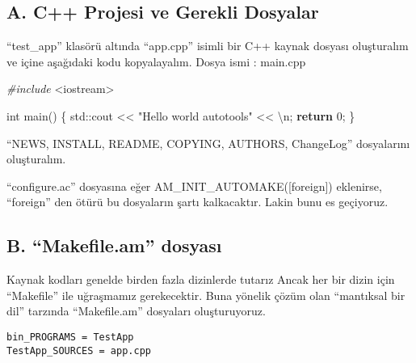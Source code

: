 \documentclass[
]{book}
\newenvironment{Shaded}{\begin{snugshade}}{\end{snugshade}}
\newcommand{\BuiltInTok}[1]{#1}
\newcommand{\CharTok}[1]{\textcolor[rgb]{0.31,0.60,0.02}{#1}}
\newcommand{\ControlFlowTok}[1]{\textcolor[rgb]{0.13,0.29,0.53}{\textbf{#1}}}
\newcommand{\DataTypeTok}[1]{\textcolor[rgb]{0.13,0.29,0.53}{#1}}
\newcommand{\DecValTok}[1]{\textcolor[rgb]{0.00,0.00,0.81}{#1}}
\newcommand{\FunctionTok}[1]{\textcolor[rgb]{0.00,0.00,0.00}{#1}}
\newcommand{\ImportTok}[1]{#1}
\newcommand{\NormalTok}[1]{#1}
\newcommand{\PreprocessorTok}[1]{\textcolor[rgb]{0.56,0.35,0.01}{\textit{#1}}}
\newcommand{\SpecialCharTok}[1]{\textcolor[rgb]{0.00,0.00,0.00}{#1}}
\newcommand{\StringTok}[1]{\textcolor[rgb]{0.31,0.60,0.02}{#1}}
\begin{document}
\hypertarget{a.-c-projesi-ve-gerekli-dosyalar}{%
\subsection*{A. C++ Projesi ve Gerekli Dosyalar}\label{a.-c-projesi-ve-gerekli-dosyalar}}

``test\_app'' klasörü altında ``app.cpp'' isimli bir C++ kaynak dosyası oluşturalım ve içine aşağıdaki kodu kopyalayalım.
Dosya ismi : main.cpp

\begin{Shaded}
\begin{Highlighting}[]
\PreprocessorTok{\#include }\ImportTok{<iostream>}

\DataTypeTok{int}\NormalTok{ main()}
\NormalTok{\{}
  \BuiltInTok{std::}\NormalTok{cout << }\StringTok{"Hello world autotools"}\NormalTok{ << }\CharTok{\textquotesingle{}}\SpecialCharTok{\textbackslash{}n}\CharTok{\textquotesingle{}}\NormalTok{;}
  \ControlFlowTok{return} \DecValTok{0}\NormalTok{;}
\NormalTok{\}}
\end{Highlighting}
\end{Shaded}

``NEWS, INSTALL, README, COPYING, AUTHORS, ChangeLog'' dosyalarını oluşturalım.

\begin{Shaded}
\end{Shaded}

``configure.ac'' dosyasına eğer AM\_INIT\_AUTOMAKE({[}foreign{]}) eklenirse, ``foreign'' den ötürü bu dosyaların şartı kalkacaktır. Lakin bunu es geçiyoruz.

\hypertarget{b.-makefile.am-dosyasux131}{%
\subsection*{B. ``Makefile.am'' dosyası}\label{b.-makefile.am-dosyasux131}}

Kaynak kodları genelde birden fazla dizinlerde tutarız Ancak her bir dizin için ``Makefile'' ile uğraşmamız gerekecektir. Buna yönelik çözüm olan ``mantıksal bir dil'' tarzında ``Makefile.am'' dosyaları oluşturuyoruz.

\begin{verbatim}
bin_PROGRAMS = TestApp
TestApp_SOURCES = app.cpp
\end{verbatim}
\end{document}
